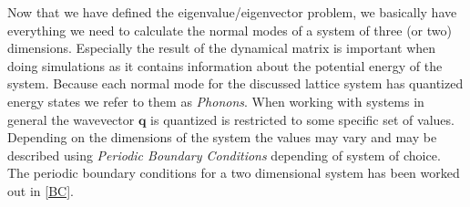 Now that we have defined the eigenvalue/eigenvector problem, we basically have everything we need to calculate the normal modes of a system of three (or two) dimensions. Especially the result of the dynamical matrix is important when doing simulations as it contains information about the potential energy of the system. Because each normal mode for the discussed lattice system has quantized energy states we refer to them as \textit{Phonons}. When working with systems in general the wavevector $\mathbf{q}$ is quantized is restricted to some specific set of values. Depending on the dimensions of the system the values may vary and may be described using \textit{Periodic Boundary Conditions} depending of system of choice. The periodic boundary conditions for a two dimensional system has been worked out in \cref{BC}. 
 
